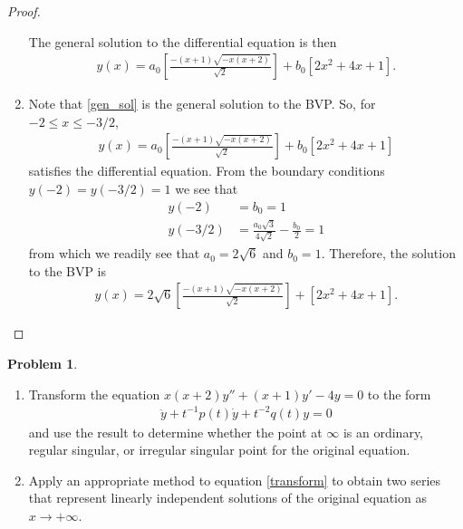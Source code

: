 \documentclass[12pt]{article}
\theoremstyle{definition}
\newtheorem{problem}{Problem}
\begin{document}
\begin{proof}
\begin{enumerate}
      The general solution to the differential equation is then
      \begin{align}\label{gen_sol}
        y(x) = a_0\left[\frac{-(x+1)\sqrt{-x(x+2)}}{\sqrt{2}}\right] + b_0\left[2x^2+4x+1\right].
      \end{align}

      \item Note that \eqref{gen_sol} is the general solution to the BVP.
        So, for $-2 \leq x \leq -3/2$,
        \begin{align*}
          y(x) = a_0\left[\frac{-(x+1)\sqrt{-x(x+2)}}{\sqrt{2}}\right] + b_0\left[2x^2+4x+1\right]
        \end{align*}
        satisfies the differential equation. From the boundary conditions $y(-2) = y(-3/2) = 1$
        we see that
        \begin{align*}
          y(-2) &= b_0 = 1 \\
          y(-3/2) &= \frac{a_0\sqrt{3}}{4\sqrt{2}}  - \frac{b_0}{2} = 1
        \end{align*}
        from which we readily see that $a_0 = 2\sqrt{6}$ and $b_0 = 1$. Therefore,
        the solution to the BVP is
        \begin{align*}
          y(x) = 2\sqrt{6}\left[\frac{-(x+1)\sqrt{-x(x+2)}}{\sqrt{2}}\right] + \left[2x^2+4x+1\right].
        \end{align*}
  \end{enumerate}
\end{proof}
\newpage


\begin{problem}
  \begin{enumerate}
    \item Transform the equation $x(x+2)y'' + (x+1)y' - 4y = 0$ to the form
      \begin{align}\label{transform}
        \ddot{y} + t^{-1}p(t)\dot{y} + t^{-2}q(t)y = 0
      \end{align}
      and use the result to determine whether the point at $\infty$ is an ordinary, regular
      singular, or irregular singular point for the original equation.
    \item Apply an appropriate method to equation \eqref{transform}  to obtain
      two series that represent linearly independent solutions of the original
      equation as $x \to +\infty$.
  \end{enumerate}
\end{problem}
\end{document}
